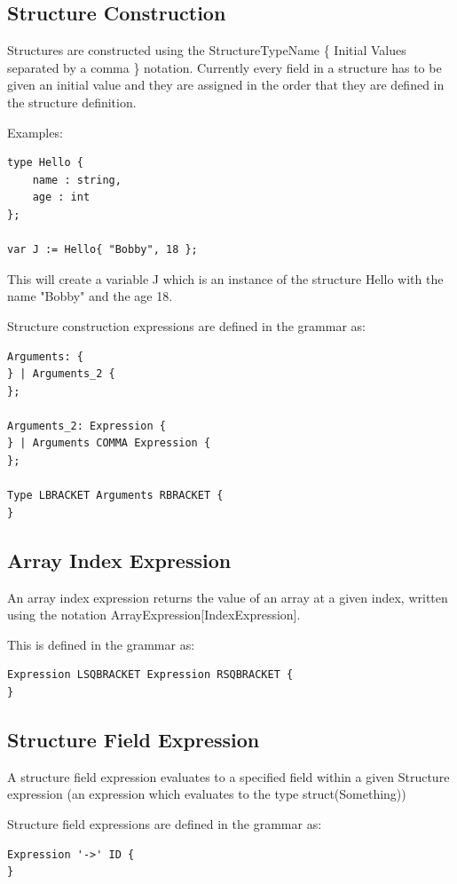 \documentclass[]{final_report}
\begin{document}
\subsection{Structure Construction}

Structures are constructed using the StructureTypeName \{ Initial Values separated by a comma \} notation. Currently every field in a structure has to be given an initial value and they are assigned in the order that they are defined in the structure definition.

Examples:

\begin{verbatim}
type Hello { 
	name : string,
	age : int
};

var J := Hello{ "Bobby", 18 };
\end{verbatim}

This will create a variable J which is an instance of the structure Hello with the name "Bobby" and the age 18.

Structure construction expressions are defined in the grammar as:
\begin{verbatim}
Arguments: {
} | Arguments_2 {
};

Arguments_2: Expression {
} | Arguments COMMA Expression {
};

Type LBRACKET Arguments RBRACKET {
}
\end{verbatim}

\subsection{Array Index Expression}

An array index expression returns the value of an array at a given index, written using the notation ArrayExpression[IndexExpression].

This is defined in the grammar as: \begin{verbatim}
Expression LSQBRACKET Expression RSQBRACKET {
}
\end{verbatim}

\subsection{Structure Field Expression}

A structure field expression evaluates to a specified field within a given Structure expression (an expression which evaluates to the type struct(Something))

Structure field expressions are defined in the grammar as:
\begin{verbatim}
Expression '->' ID {
}
\end{verbatim}
\end{document}
